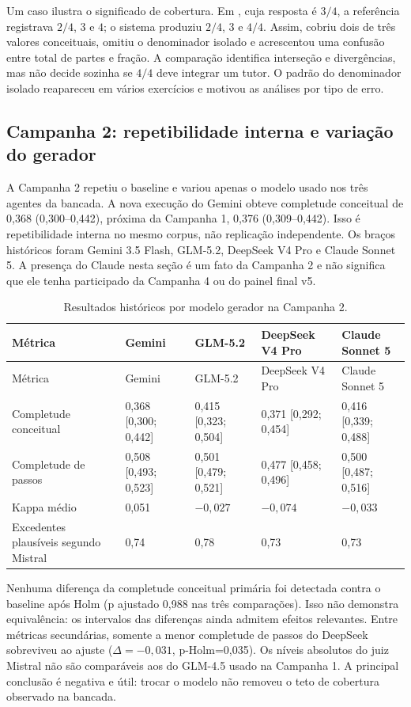 \documentclass[11pt,a4paper]{article}
\begin{document}
Um caso ilustra o significado de cobertura. Em , cuja resposta é $3/4$, a referência registrava $2/4$, $3$ e $4$; o sistema produziu $2/4$, $3$ e $4/4$. Assim, cobriu dois de três valores conceituais, omitiu o denominador isolado e acrescentou uma confusão entre total de partes e fração. A comparação identifica interseção e divergências, mas não decide sozinha se $4/4$ deve integrar um tutor. O padrão do denominador isolado reapareceu em vários exercícios e motivou as análises por tipo de erro.

\subsection{Campanha 2: repetibilidade interna e variação do gerador}

A Campanha 2 repetiu o baseline e variou apenas o modelo usado nos três agentes da bancada. A nova execução do Gemini obteve completude conceitual de 0,368 (0,300--0,442), próxima da Campanha 1, 0,376 (0,309--0,442). Isso é repetibilidade interna no mesmo corpus, não replicação independente. Os braços históricos foram Gemini 3.5 Flash, GLM-5.2, DeepSeek V4 Pro e Claude Sonnet 5. A presença do Claude nesta seção é um fato da Campanha 2 e não significa que ele tenha participado da Campanha 4 ou do painel final v5.

\begingroup
\footnotesize
\setlength{\tabcolsep}{3pt}
\begin{longtable}{@{}P{3.35cm}C{2.35cm}C{2.35cm}C{2.35cm}C{2.35cm}@{}}
\caption{Resultados históricos por modelo gerador na Campanha 2.}\label{tab:c2-models}\\
\toprule
Métrica & Gemini & GLM-5.2 & DeepSeek V4 Pro & Claude Sonnet 5 \\
\midrule
\endfirsthead
\toprule
Métrica & Gemini & GLM-5.2 & DeepSeek V4 Pro & Claude Sonnet 5 \\
\midrule
\endhead
Completude conceitual & 0,368 [0,300; 0,442] & 0,415 [0,323; 0,504] & 0,371 [0,292; 0,454] & 0,416 [0,339; 0,488] \\
Completude de passos & 0,508 [0,493; 0,523] & 0,501 [0,479; 0,521] & 0,477 [0,458; 0,496] & 0,500 [0,487; 0,516] \\
Kappa médio & 0,051 & $-0,027$ & $-0,074$ & $-0,033$ \\
Excedentes plausíveis segundo Mistral & 0,74 & 0,78 & 0,73 & 0,73 \\
\bottomrule
\end{longtable}
\endgroup

Nenhuma diferença da completude conceitual primária foi detectada contra o baseline após Holm (p ajustado 0,988 nas três comparações). Isso não demonstra equivalência: os intervalos das diferenças ainda admitem efeitos relevantes. Entre métricas secundárias, somente a menor completude de passos do DeepSeek sobreviveu ao ajuste ($\Delta=-0,031$, p-Holm=0,035). Os níveis absolutos do juiz Mistral não são comparáveis aos do GLM-4.5 usado na Campanha 1. A principal conclusão é negativa e útil: trocar o modelo não removeu o teto de cobertura observado na bancada.
\end{document}
